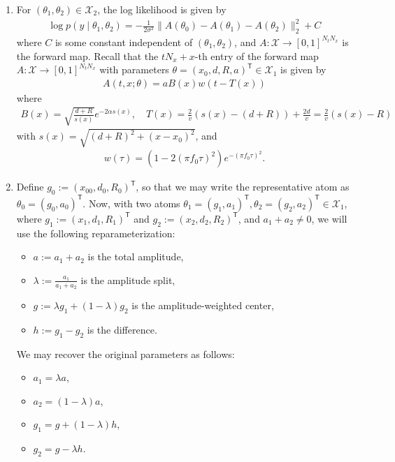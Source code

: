 \documentclass{homework}
\newcommand{\norm}[1]{\|  #1 \|}
\begin{document}
\begin{enumerate}
    \item For $(\theta_1, \theta_2) \in \mathcal{X}_2$, the log likelihood is given by 
    \begin{align*}
    \log p(y\mid\theta_1, \theta_2)
    = - \frac{1}{2\sigma^2} \norm{A(\theta_0) - A(\theta_1) - A(\theta_2)}_2^2 + C
    \end{align*}
    where $C$ is some constant independent of $(\theta_1, \theta_2)$, and $A: \mathcal{X} \to [0, 1]^{N_t N_x}$ is the forward map.
    Recall that the $t N_x + x$-th entry of the forward map $A: \mathcal{X} \to [0, 1]^{N_t N_x}$ 
    with parameters $\theta=(x_0, d, R, a)^{\mathsf T} \in \mathcal{X}_1$ is given by 
    \begin{align*}
    A(t, x; \theta) = aB(x)w(t-T(x))
    \end{align*}
    where
    \begin{align*}
    B(x) = \sqrt{\frac{d+R}{s(x)}} e^{-2\alpha s(x)}, \quad T(x) = \frac{2}{v} (s(x) - (d+R)) + \frac{2d}{v} = \frac{2}{v} (s(x) - R)
    \end{align*}
    with $s(x) = \sqrt{(d+R)^2+(x-x_0)^2}$,
    and 
    \begin{align*}
    w(\tau) = (1-2(\pi f_0\tau)^2)e^{-(\pi f_0\tau)^2}.
    \end{align*}

    \item Define $g_0:=(x_{00},d_0,R_0)^{\mathsf T}$, so that we may write the representative atom as 
    $\theta_0=(g_0,a_0)^{\mathsf T}$.
    Now, with two atoms $\theta_1=(g_1,a_1)^{\mathsf T}, \theta_2=(g_2,a_2)^{\mathsf T} \in \mathcal{X}_1$, 
    where $g_1:=(x_1,d_1,R_1)^{\mathsf T}$ and $g_2:=(x_2,d_2,R_2)^{\mathsf T}$, 
    and $a_1 + a_2 \neq 0$,
    we will use the following reparameterization:
    \begin{itemize}
    \item $a := a_1 + a_2$ is the total amplitude,
    \item $\lambda := \frac{a_1}{a_1 + a_2}$ is the amplitude split,
    \item $g := \lambda g_1 + (1-\lambda)g_2$ is the amplitude-weighted center,
    \item $h := g_1 - g_2$ is the difference.
    \end{itemize}
    We may recover the original parameters as follows:
    \begin{itemize}
    \item $a_1 = \lambda a$,
    \item $a_2 = (1-\lambda) a$,
    \item $g_1 = g + (1-\lambda)h$,
    \item $g_2 = g - \lambda h$.
    \end{itemize}


\end{enumerate}
\end{document}
